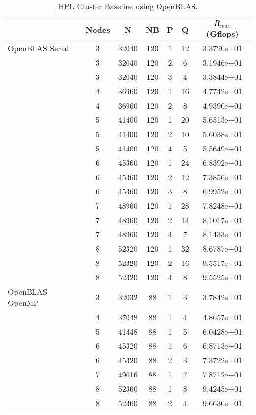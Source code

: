 \begin{table}
\begin{center}
\begin{tabular}{ |l|c|c|c|c|c|c| } 
\hline
                & Nodes & N & NB & P & Q & $R_{max}$ (Gflops) \\ 
\hline
OpenBLAS Serial & 3 & 32040 & 120 & 1 & 12 & 3.3720e+01 \\ 
                & 3 & 32040 & 120 & 2 &  6 & 3.1946e+01 \\
                & 3 & 32040 & 120 & 3 &  4 & 3.3844e+01 \\
                \cline{2-7} 
                & 4 & 36960 & 120 & 1 & 16 & 4.7742e+01 \\ 
                & 4 & 36960 & 120 & 2 &  8 & 4.9390e+01 \\ 
                \cline{2-7} 
                & 5 & 41400 & 120 & 1 & 20 & 5.6513e+01 \\ 
                & 5 & 41400 & 120 & 2 & 10 & 5.6038e+01 \\ 
                & 5 & 41400 & 120 & 4 &  5 & 5.5649e+01 \\ 
                \cline{2-7} 
                & 6 & 45360 & 120 & 1 & 24 & 6.8392e+01 \\ 
                & 6 & 45360 & 120 & 2 & 12 & 7.3856e+01 \\ 
                & 6 & 45360 & 120 & 3 &  8 & 6.9952e+01 \\ 
                \cline{2-7} 
                & 7 & 48960 & 120 & 1 & 28 & 7.8248e+01 \\ 
                & 7 & 48960 & 120 & 2 & 14 & 8.1017e+01 \\ 
                & 7 & 48960 & 120 & 4 &  7 & 8.1433e+01 \\ 
                \cline{2-7} 
                & 8 & 52320 & 120 & 1 & 32 & 8.6787e+01 \\ 
                & 8 & 52320 & 120 & 2 & 16 & 9.5517e+01 \\ 
                & 8 & 52320 & 120 & 4 &  8 & 9.5525e+01 \\ 
\hline
OpenBLAS OpenMP & 3 & 32032 & 88 & 1 & 3 & 3.7842e+01 \\ 
                \cline{2-7} 
                & 4 & 37048 & 88 & 1 & 4 & 4.8657e+01 \\ 
                \cline{2-7} 
                & 5 & 41448 & 88 & 1 & 5 & 6.0428e+01 \\ 
                \cline{2-7} 
                & 6 & 45320 & 88 & 1 & 6 & 6.8713e+01 \\ 
                & 6 & 45320 & 88 & 2 & 3 & 7.3722e+01 \\ 
                \cline{2-7} 
                & 7 & 49016 & 88 & 1 & 7 & 7.8712e+01 \\ 
                \cline{2-7} 
                & 8 & 52360 & 88 & 1 & 8 & 9.4245e+01 \\ 
                & 8 & 52360 & 88 & 2 & 4 & 9.6630e+01 \\ 
\hline
\end{tabular}
\end{center}
\caption{\label{tab:table-name}HPL Cluster Baseline using OpenBLAS.}
\end{table}
